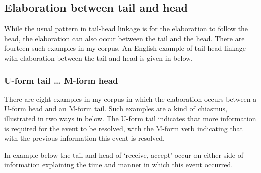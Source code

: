\subsection{Elaboration between tail and head}\label{sec:ElaTaiHea}
While the usual pattern in tail-head linkage
is for the elaboration to follow the head,
the elaboration can also occur between the tail and the head.
There are fourteen such examples in my corpus.
An English example of tail-head linkage with elaboration
between the tail and head is given in  below.

\begin{exe}\let\eachwordone=\p
	\label{ex:EngTaiHeaMed}
\end{exe}

\subsubsection{U-form tail {\ldots} M-form head}
There are eight examples in my corpus in which the elaboration
occurs between a U-form head and an M-form tail.
Such examples are a kind of chiasmus,
illustrated in two ways in  below.
The U-form tail indicates that more information
is required for the event to be resolved,
with the M-form verb indicating that with the
previous information this event is resolved.

\begin{exe}
	\label{ex:ChiTaiHeaLin}
		\begin{xlist}
		\end{xlist}
\end{exe}

In example  below the tail and head
of  `receive, accept' occur on either side of information
explaining the time and manner in which this event occurred.

